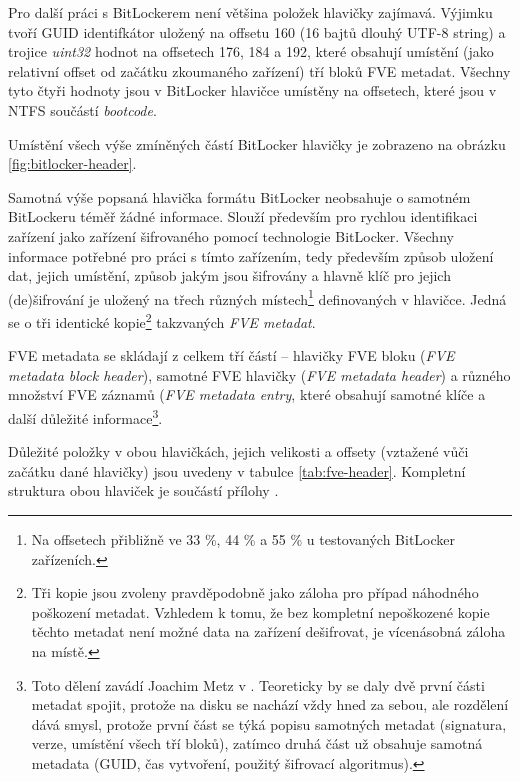 Pro další práci s BitLockerem není většina položek hlavičky zajímavá. Výjimku tvoří GUID identifkátor uložený na offsetu 160 (16 bajtů dlouhý UTF-8 string) a trojice \emph{uint32} hodnot na offsetech 176, 184 a 192, které obsahují umístění (jako relativní offset od začátku zkoumaného zařízení) tří bloků FVE metadat. Všechny tyto čtyři hodnoty jsou v BitLocker hlavičce umístěny na offsetech, které jsou v NTFS součástí \emph{bootcode}.

Umístění všech výše zmíněných  částí BitLocker hlavičky je zobrazeno na obrázku \ref{fig:bitlocker-header}.


\label{sec:fve-metadata}

Samotná výše popsaná hlavička formátu BitLocker neobsahuje o samotném BitLockeru téměř žádné informace. Slouží především pro rychlou identifikaci zařízení jako zařízení šifrovaného pomocí technologie BitLocker. Všechny informace potřebné pro práci s tímto zařízením, tedy především způsob uložení dat, jejich umístění, způsob jakým jsou šifrovány a hlavně klíč pro jejich (de)šifrování je uložený na třech různých místech\footnote{Na offsetech přibližně ve 33 \%, 44 \% a 55 \% u testovaných BitLocker zařízeních.} definovaných v hlavičce. Jedná se o tři identické kopie\footnote{Tři kopie jsou zvoleny pravděpodobně jako záloha pro případ náhodného poškození metadat. Vzhledem k tomu, že bez kompletní nepoškozené kopie těchto metadat není možné data na zařízení dešifrovat, je vícenásobná záloha na místě.} takzvaných \emph{FVE metadat}.

FVE metadata se skládají z celkem tří částí -- hlavičky FVE bloku (\emph{FVE metadata block header}), samotné FVE hlavičky (\emph{FVE metadata header}) a různého množství FVE záznamů (\emph{FVE metadata entry}, které obsahují samotné klíče a další důležité informace\cite{j2YgJeTq3IrWJRcd}\footnote{Toto dělení zavádí Joachim Metz v \cite{j2YgJeTq3IrWJRcd}. Teoreticky by se daly dvě první části metadat spojit, protože na disku se nachází vždy hned za sebou, ale rozdělení dává smysl, protože první část se týká popisu samotných metadat (signatura, verze, umístění všech tří bloků), zatímco druhá část už obsahuje samotná metadata (GUID, čas vytvoření, použitý šifrovací algoritmus).}.

Důležité položky v obou hlavičkách, jejich velikosti a offsety (vztažené vůči začátku dané hlavičky) jsou uvedeny v tabulce \ref{tab:fve-header}. Kompletní struktura obou hlaviček je součástí přílohy .

